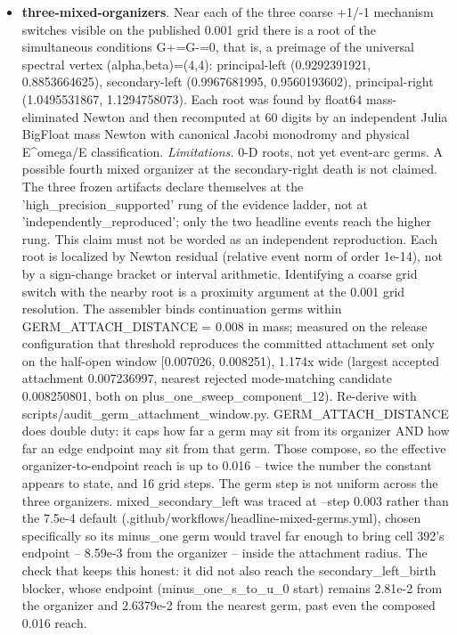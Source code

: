 \begin{itemize}
\item \textbf{three-mixed-organizers}. Near each of the three coarse +1/-1 mechanism switches visible on the published 0.001 grid there is a root of the simultaneous conditions G+=G-=0, that is, a preimage of the universal spectral vertex (alpha,beta)=(4,4): principal-left (0.9292391921, 0.8853664625), secondary-left (0.9967681995, 0.9560193602), principal-right (1.0495531867, 1.1294758073). Each root was found by float64 mass-eliminated Newton and then recomputed at 60 digits by an independent Julia BigFloat mass Newton with canonical Jacobi monodromy and physical E\^{}omega/E classification. \emph{Limitations.} 0-D roots, not yet event-arc germs. A possible fourth mixed organizer at the secondary-right death is not claimed. The three frozen artifacts declare themselves at the 'high\_precision\_supported' rung of the evidence ladder, not at 'independently\_reproduced'; only the two headline events reach the higher rung. This claim must not be worded as an independent reproduction. Each root is localized by Newton residual (relative event norm of order 1e-14), not by a sign-change bracket or interval arithmetic. Identifying a coarse grid switch with the nearby root is a proximity argument at the 0.001 grid resolution. The assembler binds continuation germs within GERM\_ATTACH\_DISTANCE = 0.008 in mass; measured on the release configuration that threshold reproduces the committed attachment set only on the half-open window [0.007026, 0.008251), 1.174x wide (largest accepted attachment 0.007236997, nearest rejected mode-matching candidate 0.008250801, both on plus\_one\_sweep\_component\_12). Re-derive with scripts/audit\_germ\_attachment\_window.py. GERM\_ATTACH\_DISTANCE does double duty: it caps how far a germ may sit from its organizer AND how far an edge endpoint may sit from that germ. Those compose, so the effective organizer-to-endpoint reach is up to 0.016 -- twice the number the constant appears to state, and 16 grid steps. The germ step is not uniform across the three organizers. mixed\_secondary\_left was traced at --step 0.003 rather than the 7.5e-4 default (.github/workflows/headline-mixed-germs.yml), chosen specifically so its minus\_one germ would travel far enough to bring cell 392's endpoint -- 8.59e-3 from the organizer -- inside the attachment radius. The check that keeps this honest: it did not also reach the secondary\_left\_birth blocker, whose endpoint (minus\_one\_s\_to\_u\_0 start) remains 2.81e-2 from the organizer and 2.6379e-2 from the nearest germ, past even the composed 0.016 reach.
\end{itemize}
